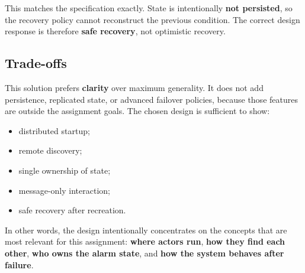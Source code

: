 This matches the specification exactly. State is intentionally \textbf{not
persisted}, so the recovery policy cannot reconstruct the previous condition.
The correct design response is therefore \textbf{safe recovery}, not optimistic
recovery.

\subsection{Trade-offs}

This solution prefers \textbf{clarity} over maximum generality. It does not add
persistence, replicated state, or advanced failover policies, because those
features are outside the assignment goals. The chosen design is sufficient to
show:
\begin{itemize}
    \item distributed startup;
    \item remote discovery;
    \item single ownership of state;
    \item message-only interaction;
    \item safe recovery after recreation.
\end{itemize}

In other words, the design intentionally concentrates on the concepts that are
most relevant for this assignment: \textbf{where actors run}, \textbf{how they
find each other}, \textbf{who owns the alarm state}, and \textbf{how the system
behaves after failure}.
